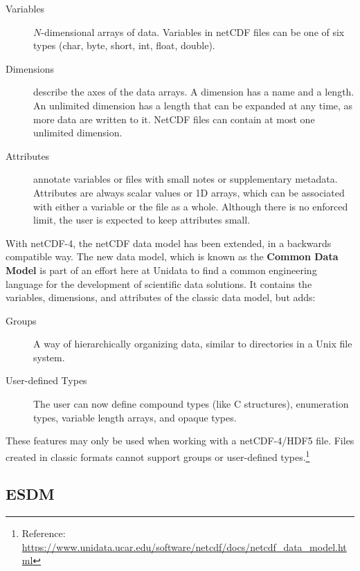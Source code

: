 \begin{description}

\item[Variables] $N$-dimensional arrays of data. Variables in netCDF files can be one of six types (char, byte, short, int, float, double).

\item[Dimensions] describe the axes of the data arrays. A dimension has a name and a length. An unlimited dimension has a length that can be expanded at any time, as more data are written to it. NetCDF files can contain at most one unlimited dimension.

\item[Attributes] annotate variables or files with small notes or supplementary metadata. Attributes are always scalar values or 1D arrays, which can be associated with either a variable or the file as a whole. Although there is no enforced limit, the user is expected to keep attributes small.

\end{description}

With netCDF-4, the netCDF data model has been extended, in a backwards compatible way. The new data model, which is known as the \textbf{Common Data Model} is part of an effort here at Unidata to find a common engineering language for the development of scientific data solutions. It contains the variables, dimensions, and attributes of the classic data model, but adds:

\begin{description}

\item[Groups] A way of hierarchically organizing data, similar to directories in a Unix file system.

\item[User-defined Types] The user can now define compound types (like C structures), enumeration types, variable length arrays, and opaque types.

\end{description}

These features may only be used when working with a netCDF-4/HDF5 file. Files created in classic formats cannot support groups or user-defined types.\footnote{Reference: \url{https://www.unidata.ucar.edu/software/netcdf/docs/netcdf_data_model.html}}

\subsection{ESDM}

